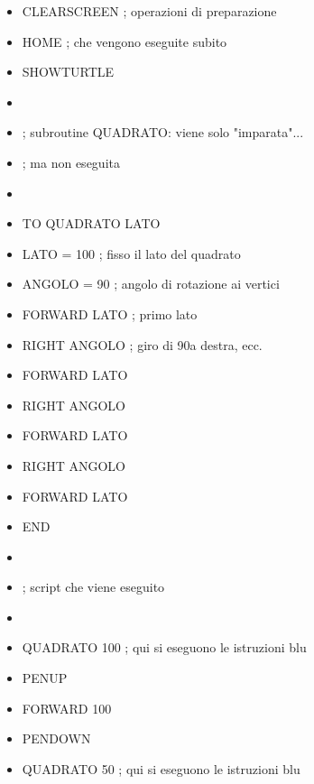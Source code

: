 \vskip 0.5cm

\begin{scriptsize}
\begin{minipage}{0.50\textwidth}
\begin{itemize}[itemsep=-3pt,parsep=2pt, leftmargin=-6.0mm]
\item[] CLEARSCREEN	; operazioni di preparazione                    
\item[] HOME			; che vengono eseguite subito
\item[] SHOWTURTLE
\item[] 
\item[] ; subroutine \color{red}QUADRATO\color{black}: viene solo "imparata"...
\item[] 			        ; ma non eseguita
\item[] 
\item[] \color{green}TO \color{red}QUADRATO \color{magenta}LATO\color{black}
\item[] 	\color{blue}LATO = 100	; fisso il lato del quadrato
\item[] 	ANGOLO = 90	; angolo di rotazione ai vertici
\item[] 	FORWARD LATO	; primo lato
\item[] 	RIGHT ANGOLO	; giro di 90\degree a destra, ecc.
\item[] 	FORWARD LATO
\item[] 	RIGHT ANGOLO
\item[] 	FORWARD LATO
\item[] 	RIGHT ANGOLO
\item[] 	FORWARD LATO
\item[] \color{green}END 
\item[] 
\item[] ; script che viene eseguito
\item[] 
\item[] \color{red}QUADRATO \color{magenta}100 \color{black}		; qui si eseguono le istruzioni blu
\item[] PENUP
\item[] FORWARD 100 
\item[] PENDOWN
\item[] \color{red}QUADRATO \color{magenta}50 		; qui si eseguono le istruzioni blu         
\end{itemize}
\end{minipage}
\end{scriptsize}
